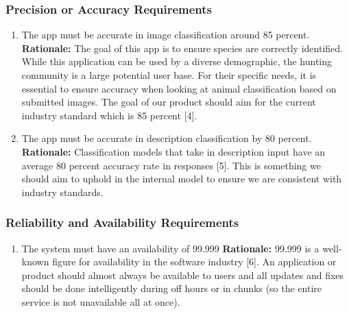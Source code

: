 \documentclass[]{article}
\begin{document}
\subsubsection{Precision or Accuracy Requirements}
\label{ssub:precision_or_accuracy_requirements}
\begin{enumerate}[{PR-PA}1. ]
	\item The app must be accurate in image classification around 85 percent.
	\textbf{Rationale:} The goal of this app is to ensure species are correctly identified. While this application can be used by a diverse demographic, the hunting community is a large potential user base. For their specific needs, it is essential to ensure accuracy when looking at animal classification based on submitted images. The goal of our product should aim for the current industry standard which is 85 percent [4]. 
	\item The app must be accurate in description classification by 80 percent. 
	\textbf{Rationale:} Classification models that take in description input have an average 80 percent accuracy rate in responses [5]. This is something we should aim to uphold in the internal model to ensure we are consistent with industry standards. 
\end{enumerate}

\subsubsection{Reliability and Availability Requirements}
\label{ssub:reliability_and_availability_requirements}
\begin{enumerate}[{PR-RA}1. ]
	\item The system must have an availability of 99.999
	\textbf{Rationale:} 99.999 is a well-known figure for availability in the software industry [6]. An application or product should almost always be available to users and all updates and fixes should be done intelligently during off hours or in chunks (so the entire service is not unavailable all at once). 
\end{enumerate}
\end{document}

